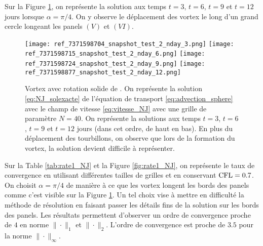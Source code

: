 Sur la Figure \ref{fig:NJ_difftps}, on représente la solution aux temps $t=3$, $t=6$, $t=9$ et $t=12$ jours lorsque $\alpha = \pi/4$. On y observe le déplacement des vortex le long d'un grand cercle longeant les panels $(V)$ et $(VI)$.

\begin{figure}[htbp]
\begin{center}
\texttt{[image: ref\_7371598704\_snapshot\_test\_2\_nday\_3.png]}
\texttt{[image: ref\_7371598715\_snapshot\_test\_2\_nday\_6.png]}
\texttt{[image: ref\_7371598724\_snapshot\_test\_2\_nday\_9.png]}
\texttt{[image: ref\_7371598877\_snapshot\_test\_2\_nday\_12.png]}
\end{center}
\caption{Vortex avec rotation solide de \cite{Nair2008}. On représente la solution \eqref{eq:NJ_solexacte} de l'équation de transport \eqref{eq:advection_sphere} avec le champ de vitesse \eqref{eq:vitesse_NJ} avec une grille de paramètre $N=40$. On représente la solutions aux temps $t=3$, $t=6$, $t=9$ et $t=12$ jours (dans cet ordre, de haut en bas). En plus du déplacement des tourbillons, on observe que lors de la formation du vortex, la solution devient difficile à représenter.}
\label{fig:NJ_difftps} 
\end{figure}

Sur la Table \ref{tab:rate1_NJ} et la Figure \ref{fig:rate1_NJ}, on représente le taux de convergence en utilisant différentes tailles de grilles et en conservant $\text{CFL} = 0.7$. On choisit $\alpha = \pi/4$ de manière à ce que les vortex longent les bords des panels comme c'est visible sur la Figure \ref{fig:NJ_difftps}. Un tel choix vise à mettre en difficulté la méthode de résolution en faisant passer les détails fins de la solution sur les bords des panels. Les résultats permettent d'observer un ordre de convergence proche de $4$ en norme $\| \cdot \|_1$ et $\| \cdot \|_2$. L'ordre de convergence est proche de $3.5$ pour la norme $\| \cdot \|_{\infty}$. 

